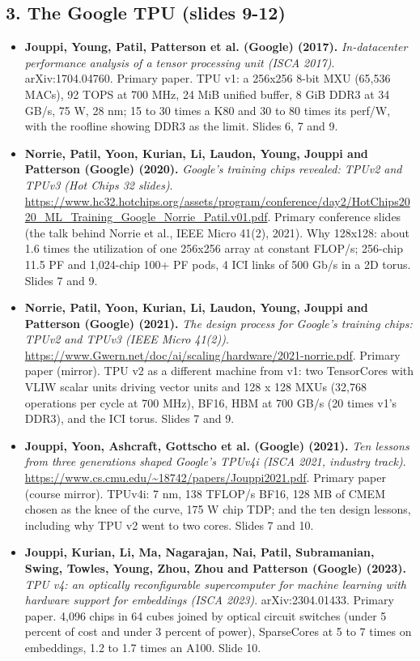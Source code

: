 \subsection*{3. The Google TPU (slides 9-12)}
\begin{itemize}[leftmargin=1.2em,itemsep=3pt]\sloppy
\item \textbf{Jouppi, Young, Patil, Patterson et al. (Google) (2017).} \textit{In-datacenter performance analysis of a tensor processing unit (ISCA 2017)}. arXiv:1704.04760. Primary paper. TPU v1: a 256x256 8-bit MXU (65,536 MACs), 92 TOPS at 700 MHz, 24 MiB unified buffer, 8 GiB DDR3 at 34 GB/s, 75 W, 28 nm; 15 to 30 times a K80 and 30 to 80 times its perf/W, with the roofline showing DDR3 as the limit. Slides 6, 7 and 9.
\item \textbf{Norrie, Patil, Yoon, Kurian, Li, Laudon, Young, Jouppi and Patterson (Google) (2020).} \textit{Google's training chips revealed: TPUv2 and TPUv3 (Hot Chips 32 slides)}. \url{https://www.hc32.hotchips.org/assets/program/conference/day2/HotChips2020_ML_Training_Google_Norrie_Patil.v01.pdf}. Primary conference slides (the talk behind Norrie et al., IEEE Micro 41(2), 2021). Why 128x128: about 1.6 times the utilization of one 256x256 array at constant FLOP/s; 256-chip 11.5 PF and 1,024-chip 100+ PF pods, 4 ICI links of 500 Gb/s in a 2D torus. Slides 7 and 9.
\item \textbf{Norrie, Patil, Yoon, Kurian, Li, Laudon, Young, Jouppi and Patterson (Google) (2021).} \textit{The design process for Google's training chips: TPUv2 and TPUv3 (IEEE Micro 41(2))}. \url{https://www.Gwern.net/doc/ai/scaling/hardware/2021-norrie.pdf}. Primary paper (mirror). TPU v2 as a different machine from v1: two TensorCores with VLIW scalar units driving vector units and 128 x 128 MXUs (32,768 operations per cycle at 700 MHz), BF16, HBM at 700 GB/s (20 times v1's DDR3), and the ICI torus. Slides 7 and 9.
\item \textbf{Jouppi, Yoon, Ashcraft, Gottscho et al. (Google) (2021).} \textit{Ten lessons from three generations shaped Google's TPUv4i (ISCA 2021, industry track)}. \url{https://www.cs.cmu.edu/~18742/papers/Jouppi2021.pdf}. Primary paper (course mirror). TPUv4i: 7 nm, 138 TFLOP/s BF16, 128 MB of CMEM chosen as the knee of the curve, 175 W chip TDP; and the ten design lessons, including why TPU v2 went to two cores. Slides 7 and 10.
\item \textbf{Jouppi, Kurian, Li, Ma, Nagarajan, Nai, Patil, Subramanian, Swing, Towles, Young, Zhou, Zhou and Patterson (Google) (2023).} \textit{TPU v4: an optically reconfigurable supercomputer for machine learning with hardware support for embeddings (ISCA 2023)}. arXiv:2304.01433. Primary paper. 4,096 chips in 64 cubes joined by optical circuit switches (under 5 percent of cost and under 3 percent of power), SparseCores at 5 to 7 times on embeddings, 1.2 to 1.7 times an A100. Slide 10.

\end{itemize}
